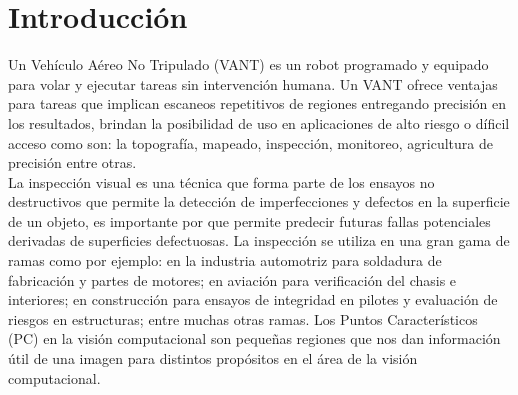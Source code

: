 \documentclass[]{report}
\begin{document}
\tableofcontents

\chapter{Introducción}
Un Vehículo Aéreo No Tripulado (VANT) es un robot programado y equipado para volar y ejecutar tareas sin intervención humana. Un VANT ofrece ventajas para tareas que implican escaneos repetitivos de regiones entregando precisión en los resultados, brindan la posibilidad de uso en aplicaciones de alto riesgo o díficil acceso como son: la topografía, mapeado, inspección, monitoreo, agricultura de precisión entre otras. \\
La inspección visual es una técnica que forma parte de los ensayos no destructivos que permite la detección de imperfecciones y defectos en la superficie de un objeto, es importante por que permite predecir futuras fallas potenciales derivadas de superficies defectuosas. La inspección se utiliza en una gran gama de ramas como por ejemplo: en la industria automotriz para soldadura de fabricación y partes de motores; en aviación para verificación del chasis e interiores; en construcción para ensayos de integridad en pilotes y evaluación de riesgos en estructuras; entre muchas otras ramas.
Los Puntos Característicos (PC) en la visión computacional son pequeñas regiones que nos dan información útil de una imagen para distintos propósitos en el área de la visión computacional.\\
\end{document}
